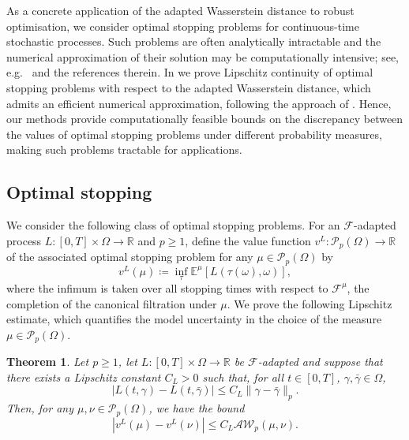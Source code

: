 \documentclass[onseside, final]{amsart}
\newtheorem{theorem}{Theorem}[section]
\theoremstyle{definition}
\newcommand{\F}{\mathcal F}
\newcommand{\Pc}{\mathcal P}
\newcommand{\R}{\mathbb R}
\newcommand{\E}{\mathbb E}
\newcommand{\AW}{\mathcal A\mathcal W}
\numberwithin{equation}{section}
\begin{document}
	As a concrete application of the adapted Wasserstein distance to robust optimisation, we consider optimal stopping problems for continuous-time stochastic processes.
	Such problems are often analytically intractable and the numerical approximation of their solution may be computationally intensive; see, e.g.~\citep{BeChJeWe21} and the references therein.
	In  we prove Lipschitz continuity of optimal stopping problems with respect to the adapted Wasserstein distance, which admits an efficient numerical approximation, following the approach of .
	Hence, our methods provide computationally feasible bounds on the discrepancy between the values of optimal stopping problems under different probability measures, making such problems tractable for applications.

	\subsection{Optimal stopping}		
		We consider the following class of optimal stopping problems. For an $\F$-adapted process $L \colon [0, T] \times \Omega \to \R$ and $p \geq 1$, define the value function $v^L \colon \Pc_p(\Omega) \to \R$ of the associated optimal stopping problem for any $\mu \in \Pc_p(\Omega)$ by
		\begin{equation}
			v^L(\mu) \coloneqq \inf_{\tau} \E^\mu[L(\tau (\omega), \omega)],                                                                                                                                                                                                                                                                                                                                                                                 
		\end{equation} where the infimum is taken over all stopping times with respect to $\F^\mu$, the completion of the canonical filtration under $\mu$.
		We prove the following Lipschitz estimate, which quantifies the model uncertainty in the choice of the measure $\mu \in \Pc_p(\Omega)$. 
		
		\begin{theorem}\label{thm:optimal-stopping}
			Let $p \geq 1$, let $L \colon [0, T] \times \Omega \to \R$ be $\F$-adapted and suppose that there exists a Lipschitz constant $C_L > 0$ such that, for all $t \in [0, T]$, $\gamma, \bar \gamma \in \Omega$,
			\begin{equation}
				|L(t, \gamma) - L(t, \bar \gamma)| \leq C_L \|\gamma - \bar \gamma\|_p.
			\end{equation}
			Then, for any $\mu, \nu \in \Pc_p(\Omega)$, we have the bound
			\begin{equation}\label{eq:optimal-stopping-bound}
				|v^L(\mu) - v^L(\nu)| \leq C_L \AW_p(\mu, \nu).
			\end{equation}
		\end{theorem}
\end{document}
